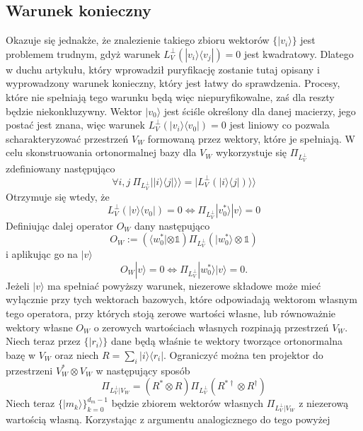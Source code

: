 \documentclass[10pt]{article} %
\newcommand{\Ket}[1]{|#1\rangle}
\newcommand{\Bra}[1]{\langle#1|}
\newcommand{\KKet}[1]{|#1\rangle\rangle}
\newcommand{\I}{\mathbb{1}}
\newcommand{\LPV}{{L^\perp_V}}
\begin{document}
\subsection{Warunek konieczny}
Okazuje się jednakże, że znalezienie takiego zbioru wektorów $\{ \Ket{v_i} \}$ jest problemem trudnym, gdyż warunek $L^\perp_V(\Ket{v_i}\Bra{v_j})=0$ jest kwadratowy. Dlatego w duchu artykułu, który wprowadził puryfikację 
zostanie tutaj opisany i wyprowadzony warunek konieczny, który jest łatwy do sprawdzenia. Procesy, które nie spełniają tego warunku będą więc niepuryfikowalne, zaś dla reszty będzie niekonkluzywny. Wektor $\Ket{v_0}$ jest ściśle określony dla danej macierzy, jego postać jest znana, więc 
warunek $\LPV(\Ket{v_i}\Bra{v_0}) = 0$ jest liniowy co pozwala scharakteryzować przestrzeń $V_W$ formowaną przez wektory, które je spełniają.
W celu skonstruowania ortonormalnej bazy dla $V_W$ wykorzystuje się $\Pi_\LPV$ zdefiniowany następująco
\begin{equation}
\forall i,j ~\Pi_\LPV \KKet{\Ket{i}\Bra{j}} = \KKet{\LPV(\Ket{i}\Bra{j})}
\end{equation}
Otrzymuje się wtedy, że
\begin{equation}
\LPV(\Ket{v}\Bra{v_0}) = 0 \iff \Pi_\LPV \Ket{v^*_0} \Ket{v} = 0
\end{equation}
Definiując dalej operator $O_W$ dany następująco
\begin{equation}
O_W:= \left(\Bra{w^*_0} \otimes \I\right) \Pi_\LPV \left( \Ket{w^*_0} \otimes \I\right)
\end{equation}
i aplikując go na $\Ket{v}$
\begin{equation}
O_W\Ket{v} = 0 \iff \Pi_\LPV \Ket{w^*_0} \Ket{v} = 0.
\end{equation}
Jeżeli $\Ket{v}$ ma spełniać powyższy warunek, niezerowe składowe może mieć wyłącznie przy tych wektorach bazowych, które odpowiadają wektorom własnym tego operatora, przy których stoją zerowe wartości własne, lub równoważnie wektory własne $O_W$ o zerowych wartościach własnych rozpinają przestrzeń $V_W$. Niech teraz przez $\{ \Ket{r_i}\}$ dane będą właśnie te wektory tworzące ortonormalna bazę w $V_W$ oraz niech $R = \sum_i \Ket{i}\Bra{r_i}$. Ograniczyć można ten projektor do przestrzeni $V^*_W \otimes V_W$ w następujący sposób
\begin{equation}
\Pi_{\LPV|V_W} = \left(R^* \otimes R \right) \Pi_\LPV \left(R^{*\dag} \otimes R^\dag \right)
\end{equation}
Niech teraz $\{ \Ket{m_k} \}^{d_m-1}_{k=0}$ będzie zbiorem wektorów własnych $\Pi_{\LPV|V_W}$ z niezerową wartością własną. Korzystając z argumentu analogicznego do tego powyżej 
\end{document}
